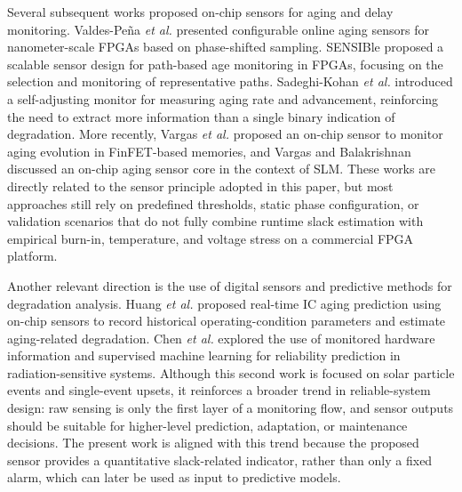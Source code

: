 \documentclass[a4paper,10pt,twoside,twocolumn,final]{JICS_LaTexGuidelines}
\begin{document}
Several subsequent works proposed on-chip sensors for aging and delay monitoring. Valdes-Pe\~na \textit{et al.} \cite{valdes} presented configurable online aging sensors for nanometer-scale FPGAs based on phase-shifted sampling. SENSIBle \cite{sensible} proposed a scalable sensor design for path-based age monitoring in FPGAs, focusing on the selection and monitoring of representative paths. Sadeghi-Kohan \textit{et al.} \cite{Self_Adjusting_Monitor} introduced a self-adjusting monitor for measuring aging rate and advancement, reinforcing the need to extract more information than a single binary indication of degradation. More recently, Vargas \textit{et al.} \cite{Base_Sensor} proposed an on-chip sensor to monitor aging evolution in FinFET-based memories, and Vargas and Balakrishnan \cite{vargas_and_buff} discussed an on-chip aging sensor core in the context of SLM. These works are directly related to the sensor principle adopted in this paper, but most approaches still rely on predefined thresholds, static phase configuration, or validation scenarios that do not fully combine runtime slack estimation with empirical burn-in, temperature, and voltage stress on a commercial FPGA platform.

Another relevant direction is the use of digital sensors and predictive methods for degradation analysis. Huang \textit{et al.} \cite{Huang2021RealTimeAgingPrediction} proposed real-time IC aging prediction using on-chip sensors to record historical operating-condition parameters and estimate aging-related degradation. Chen \textit{et al.} \cite{chen2022solar_prediction} explored the use of monitored hardware information and supervised machine learning for reliability prediction in radiation-sensitive systems. Although this second work is focused on solar particle events and single-event upsets, it reinforces a broader trend in reliable-system design: raw sensing is only the first layer of a monitoring flow, and sensor outputs should be suitable for higher-level prediction, adaptation, or maintenance decisions. The present work is aligned with this trend because the proposed sensor provides a quantitative slack-related indicator, rather than only a fixed alarm, which can later be used as input to predictive models.
\end{document}
